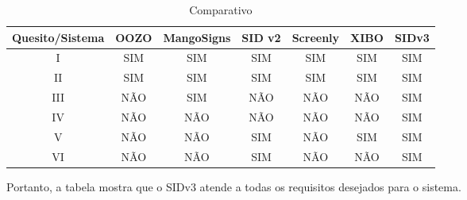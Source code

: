 \begin{table}[h!]
	\caption{Comparativo}
	\label {tlb:comparativo2}
	\centering
	\begin{tabular}{|c|c|c|c|c|c|c|}
		\hline
		Quesito/Sistema & OOZO & MangoSigns & SID v2 & Screenly & XIBO & SIDv3 \\ \hline
		I 				& SIM  & SIM		& SIM & SIM 	 & SIM	& SIM \\ \hline
		II 				& SIM  & SIM 		& SIM & SIM 	 & SIM		& SIM \\ \hline
		III				& NÃO  & SIM 		& NÃO & NÃO 	 & NÃO		& SIM \\ \hline
		IV 				& NÃO  & NÃO 		& NÃO & NÃO 	 & NÃO		& SIM \\ \hline
		V 				& NÃO  & NÃO 		& SIM & NÃO 	 & SIM		& SIM \\ \hline
		VI 				& NÃO  & NÃO 		& SIM & NÃO 	 & NÃO		& SIM \\ \hline
	\end{tabular}
\end{table}

Portanto, a tabela mostra que o SIDv3 atende a todas os requisitos desejados para o sistema.

